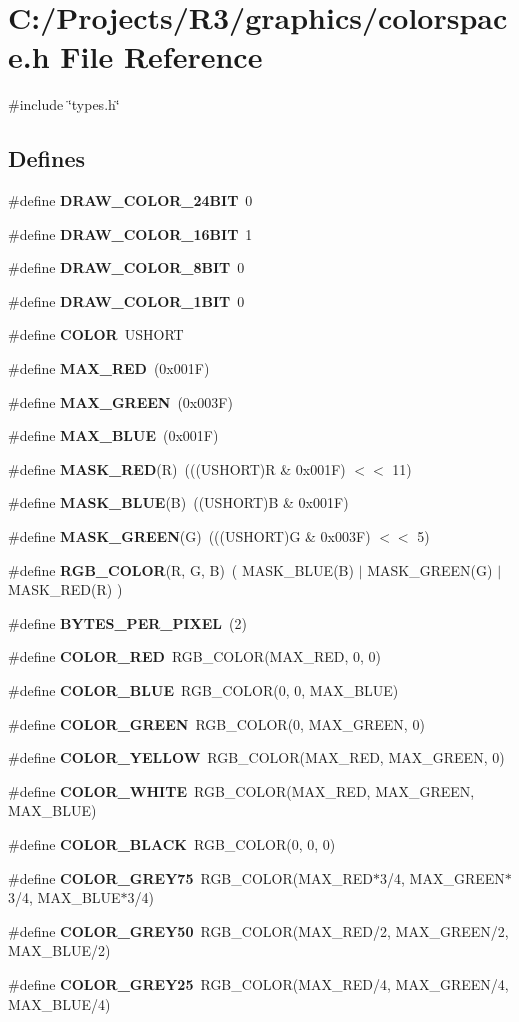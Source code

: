 \section{C:/Projects/R3/graphics/colorspace.h File Reference}
\label{colorspace_8h}
{\ttfamily \#include \char`\"{}types.h\char`\"{}}\par
\subsection*{Defines}
\begin{DoxyCompactItemize}
\item 
\#define {\bf DRAW\_\-COLOR\_\-24BIT}~0
\item 
\#define {\bf DRAW\_\-COLOR\_\-16BIT}~1
\item 
\#define {\bf DRAW\_\-COLOR\_\-8BIT}~0
\item 
\#define {\bf DRAW\_\-COLOR\_\-1BIT}~0
\item 
\#define {\bf COLOR}~USHORT
\item 
\#define {\bf MAX\_\-RED}~(0x001F)
\item 
\#define {\bf MAX\_\-GREEN}~(0x003F)
\item 
\#define {\bf MAX\_\-BLUE}~(0x001F)
\item 
\#define {\bf MASK\_\-RED}(R)~(((USHORT)R \& 0x001F) $<$$<$ 11)
\item 
\#define {\bf MASK\_\-BLUE}(B)~((USHORT)B \& 0x001F)
\item 
\#define {\bf MASK\_\-GREEN}(G)~(((USHORT)G \& 0x003F) $<$$<$ 5)
\item 
\#define {\bf RGB\_\-COLOR}(R, G, B)~( MASK\_\-BLUE(B) $|$ MASK\_\-GREEN(G) $|$ MASK\_\-RED(R) )
\item 
\#define {\bf BYTES\_\-PER\_\-PIXEL}~(2)
\item 
\#define {\bf COLOR\_\-RED}~RGB\_\-COLOR(MAX\_\-RED, 		0, 				0)
\item 
\#define {\bf COLOR\_\-BLUE}~RGB\_\-COLOR(0, 			0, 				MAX\_\-BLUE)
\item 
\#define {\bf COLOR\_\-GREEN}~RGB\_\-COLOR(0, 			MAX\_\-GREEN,		0)
\item 
\#define {\bf COLOR\_\-YELLOW}~RGB\_\-COLOR(MAX\_\-RED,		MAX\_\-GREEN,		0)
\item 
\#define {\bf COLOR\_\-WHITE}~RGB\_\-COLOR(MAX\_\-RED,		MAX\_\-GREEN,		MAX\_\-BLUE)
\item 
\#define {\bf COLOR\_\-BLACK}~RGB\_\-COLOR(0,			0,				0)
\item 
\#define {\bf COLOR\_\-GREY75}~RGB\_\-COLOR(MAX\_\-RED$\ast$3/4,	MAX\_\-GREEN$\ast$3/4,	MAX\_\-BLUE$\ast$3/4)
\item 
\#define {\bf COLOR\_\-GREY50}~RGB\_\-COLOR(MAX\_\-RED/2,	MAX\_\-GREEN/2,	MAX\_\-BLUE/2)
\item 
\#define {\bf COLOR\_\-GREY25}~RGB\_\-COLOR(MAX\_\-RED/4,	MAX\_\-GREEN/4,	MAX\_\-BLUE/4)
\end{DoxyCompactItemize}


